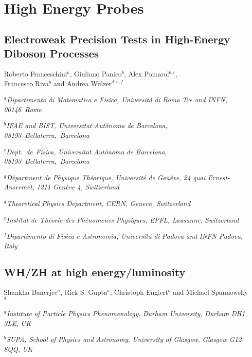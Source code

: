 \documentclass[../report.tex]{subfiles}
\providecommand{\main}{..}
\begin{document}
\section{High Energy Probes}







\subsection{Electroweak Precision Tests  in High-Energy Diboson Processes} \label{WZlong}
\begin{center}
{Roberto Franceschini$^{a}$,  Giuliano Panico$^{b}$,  Alex Pomarol$^{b,c}$,\\
  Francesco Riva$^g$  and Andrea Wulzer$^{d,e,f}$}
\centerline{$^a${\it Dipartimento di Matematica e Fisica, Universit\`a di Roma Tre and INFN, 
00146~Rome}}
\centerline{$^b${\it \small IFAE and BIST, Universitat Aut\`onoma de Barcelona, 08193~Bellaterra,~Barcelona}}
\centerline{$^c${\it \small Dept.~de~F\'isica, Universitat Aut{\`o}noma de Barcelona, 08193~Bellaterra,~Barcelona}}
\centerline{$^g${\it\small  D\'epartment de Physique Th\'eorique, Universit\'e de Gen\`eve,
24 quai Ernest-Ansermet, 1211 Gen\`eve 4, Switzerland}}
\centerline{$^d${\it\small Theoretical Physics Department, CERN, Geneva, Switzerland}}
\centerline{$^e${\it \small Institut de Th\'eorie des Ph\'enomenes Physiques, EPFL, Lausanne, Switzerland}}
\centerline{$^f${\it \small Dipartimento di Fisica e Astronomia, Universit\'a di Padova and INFN Padova, Italy}}
\end{center}





\subsection{WH/ZH at high energy/luminosity}\label{sec:ZHWZeft}
\begin{center}
{Shankha Banerjee$^{a}$,  Rick S. Gupta$^{a}$,  Christoph Englert$^{b}$ and Michael Spannowsky$^{a}$}
\centerline{$^a${\it \small Institute of Particle Physics Phenomenology, Durham University, Durham DH1 3LE, UK}}
\centerline{$^b${\it \small SUPA, School of Physics and Astronomy, University of Glasgow, Glasgow G12 8QQ, UK}}
\end{center}
\end{document}
